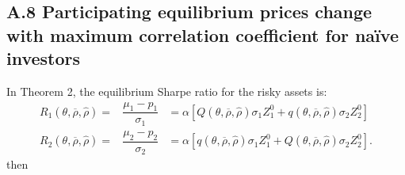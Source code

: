 \documentclass[10pt]{article}
\begin{document}
\subsection*{A.8 \quad Participating equilibrium prices change with maximum correlation coefficient for na\"ive investors}

\quad
In Theorem 2, the equilibrium Sharpe ratio for the risky assets is:
{\footnotesize \begin{eqnarray*}
R_1 (\theta, \overline{\rho}, {\hat \rho}) = & \dfrac{\mu_1 - p_1}{\sigma_1} & = \alpha \left[ Q (\theta, \overline{\rho}, {\hat \rho}) \sigma_1 Z_1^0 + q (\theta, \overline{\rho}, {\hat \rho}) \sigma_2 Z_2^0 \right] \\
R_2 (\theta, \overline{\rho}, {\hat \rho}) = & \dfrac{\mu_2 - p_2}{\sigma_2} & = \alpha \left[ q (\theta, \overline{\rho}, {\hat \rho}) \sigma_1 Z_1^0 + Q (\theta, \overline{\rho}, {\hat \rho}) \sigma_2 Z_2^0 \right].
\end{eqnarray*}}
then
\end{document}
